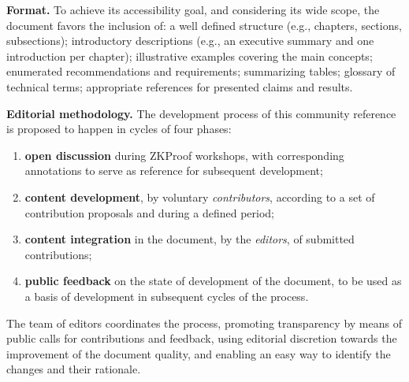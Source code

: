 \textbf{Format.}
	To achieve its accessibility goal, and considering its wide scope, the document favors the inclusion of: 
	a well defined structure (e.g., chapters, sections, subsections);
	introductory descriptions (e.g., an executive summary and one introduction per chapter); 
	illustrative examples covering the main concepts; 
	enumerated recommendations and requirements; 
	summarizing tables; 
	glossary of technical terms; 
	appropriate references for presented claims and results.


\textbf{Editorial methodology.}
	The development process of this community reference is proposed to happen in cycles of four phases:
	\begin{enumerate}[label=(\roman*),itemsep=0ex]
	\item \textbf{open discussion} during ZKProof workshops, with corresponding annotations to serve as reference for subsequent development;
	\item \textbf{content development}, by voluntary \emph{contributors}, according to a set of contribution proposals and during a defined period;
	\item \textbf{content integration} in the document, by the \emph{editors}, of submitted contributions; 
	\item \textbf{public feedback} on the state of development of the document, to be used as a basis of development in subsequent cycles of the process.
	\end{enumerate}
	The team of editors coordinates the process, 
promoting transparency by means of public calls for contributions and feedback, 
using editorial discretion towards the improvement of the document quality,
and enabling an easy way to identify the changes and their rationale.
